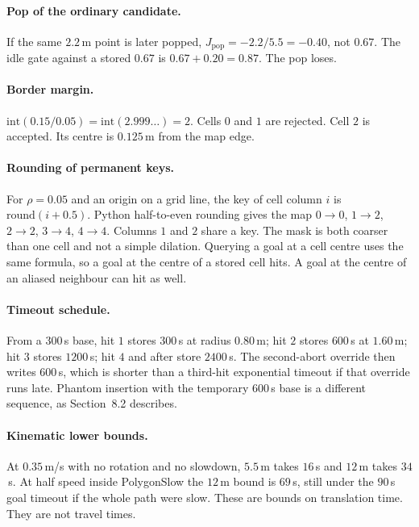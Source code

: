 \documentclass[11pt]{article}
\begin{document}
\paragraph{Pop of the ordinary candidate.}
If the same $2.2$\,m point is later popped, $J_{\mathrm{pop}}=-2.2/5.5=-0.40$, not $0.67$. The idle gate against a stored $0.67$ is $0.67+0.20=0.87$. The pop loses.

\paragraph{Border margin.}
$\mathrm{int}(0.15/0.05)=\mathrm{int}(2.999\ldots)=2$. Cells $0$ and $1$ are rejected. Cell $2$ is accepted. Its centre is $0.125$\,m from the map edge.

\paragraph{Rounding of permanent keys.}
For $\rho=0.05$ and an origin on a grid line, the key of cell column $i$ is $\mathrm{round}(i+0.5)$. Python half-to-even rounding gives the map $0\!\rightarrow\!0$, $1\!\rightarrow\!2$, $2\!\rightarrow\!2$, $3\!\rightarrow\!4$, $4\!\rightarrow\!4$. Columns $1$ and $2$ share a key. The mask is both coarser than one cell and not a simple dilation. Querying a goal at a cell centre uses the same formula, so a goal at the centre of a stored cell hits. A goal at the centre of an aliased neighbour can hit as well.

\paragraph{Timeout schedule.}
From a $300$\,s base, hit $1$ stores $300$\,s at radius $0.80$\,m; hit $2$ stores $600$\,s at $1.60$\,m; hit $3$ stores $1200$\,s; hit $4$ and after store $2400$\,s. The second-abort override then writes $600$\,s, which is shorter than a third-hit exponential timeout if that override runs late. Phantom insertion with the temporary $600$\,s base is a different sequence, as Section~8.2 describes.

\paragraph{Kinematic lower bounds.}
At $0.35$\,m/s with no rotation and no slowdown, $5.5$\,m takes $16$\,s and $12$\,m takes $34$\,s. At half speed inside PolygonSlow the $12$\,m bound is $69$\,s, still under the $90$\,s goal timeout if the whole path were slow. These are bounds on translation time. They are not travel times.
\end{document}
